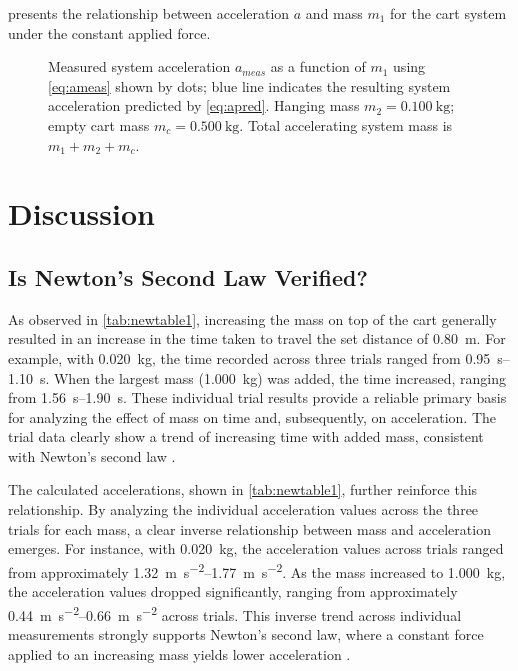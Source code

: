 ﻿\documentclass[reprint,amsmath,amssymb,aps]{revtex4-2}
\begin{document}
 presents the relationship between acceleration $a$ and mass $m_1$ for the cart system under the constant applied force. 
\begin{figure}
\begin{center}

\end{center}
\caption{\label{fig:5} Measured system acceleration $a_{meas}$ as a function of $m_1$ using \cref{eq:ameas} shown by dots; blue line indicates the resulting system acceleration predicted by \cref{eq:apred}. Hanging mass $m_2=\qty{0.100}{\kilo\gram}$; empty cart mass $m_c=\qty{0.500}{\kilo\gram}$. Total accelerating system mass is $m_1+m_2+m_c$.}
\end{figure}








\section{Discussion}

\subsection{Is Newton’s Second Law Verified?}
As observed in \cref{tab:newtable1}, increasing the mass on top of the cart generally resulted in an increase in the time taken to travel the set distance of \qty{0.80}{\meter}. For example, with \qty{0.020}{\kilo\gram}, the time recorded across three trials ranged from \qtyrange{0.95}{1.10}{\second}. When the largest mass (\qty{1.000}{\kilo\gram}) was added, the time increased, ranging from \qtyrange{1.56}{1.90}{\second}. These individual trial results provide a reliable primary basis for analyzing the effect of mass on time and, subsequently, on acceleration. The trial data clearly show a trend of increasing time with added mass, consistent with Newton’s second law \cite{knight2017physics}.

The calculated accelerations, shown in \cref{tab:newtable1}, further reinforce this relationship. By analyzing the individual acceleration values across the three trials for each mass, a clear inverse relationship between mass and acceleration emerges. For instance, with \qty{0.020}{\kilo\gram}, the acceleration values across trials ranged from approximately \qtyrange{1.32}{1.77}{\meter\per\second\squared}. As the mass increased to \qty{1.000}{\kilo\gram}, the acceleration values dropped significantly, ranging from approximately \qtyrange{0.44}{0.66}{\meter\per\second\squared} across trials. This inverse trend across individual measurements strongly supports Newton’s second law, where a constant force applied to an increasing mass yields lower acceleration \cite{knight2017physics}. 
\end{document}
